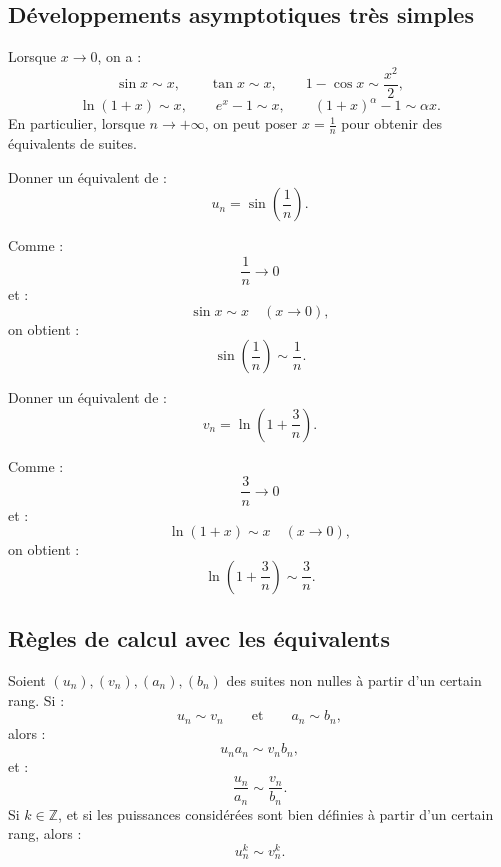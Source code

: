 \documentclass[11pt,a4paper]{article}
\newcommand{\Z}{\mathbb Z}
\begin{document}
\subsection{Développements asymptotiques très simples}

\begin{theorembox}
Lorsque \(x\to0\), on a :
\[
\sin x\sim x,
\qquad
\tan x\sim x,
\qquad
1-\cos x\sim \frac{x^2}{2},
\]
\[
\ln(1+x)\sim x,
\qquad
e^x-1\sim x,
\qquad
(1+x)^\alpha-1\sim \alpha x.
\]
En particulier, lorsque \(n\to+\infty\), on peut poser \(x=\frac1n\) pour obtenir des équivalents de suites.
\end{theorembox}

\begin{exercicebox}
Donner un équivalent de :
\[
u_n=\sin\left(\frac1n\right).
\]
\end{exercicebox}

\begin{correctionbox}
Comme :
\[
\frac1n\to0
\]
et :
\[
\sin x\sim x\quad(x\to0),
\]
on obtient :
\[
\sin\left(\frac1n\right)\sim \frac1n.
\]
\end{correctionbox}

\begin{exercicebox}
Donner un équivalent de :
\[
v_n=\ln\left(1+\frac3n\right).
\]
\end{exercicebox}

\begin{correctionbox}
Comme :
\[
\frac3n\to0
\]
et :
\[
\ln(1+x)\sim x\quad(x\to0),
\]
on obtient :
\[
\ln\left(1+\frac3n\right)\sim \frac3n.
\]
\end{correctionbox}

\subsection{Règles de calcul avec les équivalents}

\begin{theorembox}
Soient \((u_n),(v_n),(a_n),(b_n)\) des suites non nulles à partir d'un certain rang.
Si :
\[
u_n\sim v_n
\qquad\text{et}\qquad
a_n\sim b_n,
\]
alors :
\[
u_n a_n\sim v_n b_n,
\]
et :
\[
\frac{u_n}{a_n}\sim \frac{v_n}{b_n}.
\]
Si \(k\in\Z\), et si les puissances considérées sont bien définies à partir d'un certain rang, alors :
\[
u_n^k\sim v_n^k.
\]
\end{theorembox}
\end{document}
